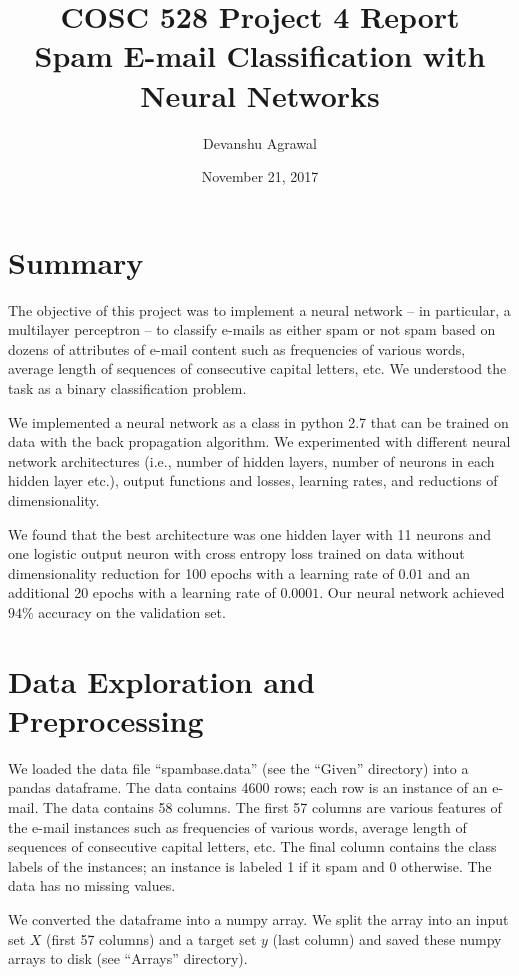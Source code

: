 \documentclass[12pt]{article}
\title{COSC 528 Project 4 Report \\
Spam E-mail Classification with Neural Networks}
\author{Devanshu Agrawal}
\date{November 21, 2017}
\begin{document}
\maketitle

\section{Summary}

The objective of this project was to implement a neural network -- in particular, a multilayer perceptron -- to classify e-mails as either spam or not spam based on dozens of attributes of e-mail content such as frequencies of various words, average length of sequences of consecutive capital letters, etc. We understood the task as a binary classification problem.

We implemented a neural network as a class in python 2.7 that can be trained on data with the back propagation algorithm. We experimented with different neural network architectures (i.e., number of hidden layers, number of neurons in each hidden layer etc.), output functions and losses, learning rates, and reductions of dimensionality.

We found that the best architecture was one hidden layer with 11 neurons and one logistic output neuron with cross entropy loss trained on data without dimensionality reduction for 100 epochs with a learning rate of $0.01$ and an additional 20 epochs with a learning rate of $0.0001$. Our neural network achieved $94\%$ accuracy on the validation set.


\section{Data Exploration and Preprocessing}

We loaded the data file ``spambase.data'' (see the ``Given'' directory) into a pandas dataframe. The data contains 4600 rows; each row is an instance of an e-mail. The data contains 58 columns. The first 57 columns are various features of the e-mail instances such as frequencies of various words, average length of sequences of consecutive capital letters, etc. The final column contains the class labels of the instances; an instance is labeled 1 if it spam and 0 otherwise. The data has no missing values.

We converted the dataframe into a numpy array. We split the array into an input set $X$ (first 57 columns) and a target set $y$ (last column) and saved these numpy arrays to disk (see ``Arrays'' directory).
\end{document}

